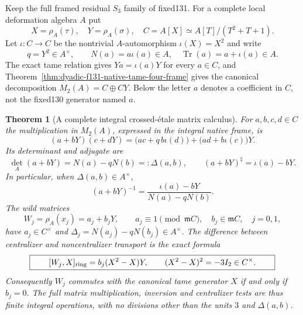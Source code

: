 \documentclass[11pt]{article}
\newtheorem{theorem}{Theorem}[section]
\theoremstyle{definition}
\begin{document}
Keep the full framed residual $S_3$ family of fixed131.
For a complete local deformation algebra $A$ put
\[
X=\rho_A(\tau),\quad Y=\rho_A(\sigma),\quad
C=A[X]\simeq A[T]/(T^2+T+1).
\]
Let $\iota:C\to C$ be the nontrivial
$A$-automorphism $\iota(X)=X^2$ and write
\begin{equation}\label{eq:dyadic-f132-crossed-setup}
q=Y^2\in A^\times,\qquad
N(a)=a\iota(a)\in A,\quad
\operatorname{Tr}(a)=a+\iota(a)\in A.
\end{equation}
The exact tame relation gives
$Y a=\iota(a)Y$ for every $a\in C$,
and Theorem~\ref{thm:dyadic-f131-native-tame-four-frame}
gives the canonical decomposition
$M_2(A)=C\oplus CY$.
Below the letter $a$ denotes a
coefficient in $C$, not the
fixed130 generator named $a$.

\begin{theorem}[A complete integral crossed-\'etale matrix calculus]
\label{thm:dyadic-f132-crossed-etale-multiplication}
For $a,b,c,d\in C$ the multiplication
in $M_2(A)$, expressed in the integral
native frame, is
\begin{equation}\label{eq:dyadic-f132-crossed-product-law}
\boxed{
(a+bY)(c+dY)
=
\bigl(ac+q\,b\iota(d)\bigr)
+\bigl(ad+b\iota(c)\bigr)Y.
}
\end{equation}
Its determinant and adjugate are
\begin{equation}\label{eq:dyadic-f132-crossed-determinant}
\boxed{
\det_A(a+bY)=N(a)-qN(b)=:\Delta(a,b),
\qquad
(a+bY)^\natural=\iota(a)-bY.
}
\end{equation}
In particular, when $\Delta(a,b)\in A^\times$,
\begin{equation}\label{eq:dyadic-f132-crossed-inverse}
\boxed{\qquad
(a+bY)^{-1}
=\frac{\iota(a)-bY}{N(a)-qN(b)}.
\qquad}
\end{equation}
The wild matrices
\[
W_j=\rho_A(x_j)=a_j+b_jY,\qquad
a_j\equiv1\pmod{\mathfrak m C},\quad
b_j\in\mathfrak m C,
\quad j=0,1,
\]
have $a_j\in C^\times$ and
$\Delta_j=N(a_j)-qN(b_j)\in A^\times$.
The difference between centralizer
and noncentralizer transport is
the exact formula
\begin{equation}\label{eq:dyadic-f132-wild-commutator}
\boxed{\qquad
[W_j,X]_{\rm ring}
=b_j(X^2-X)Y,\qquad
(X^2-X)^2=-3I_2\in C^\times.
\qquad}
\end{equation}
Consequently $W_j$ commutes with
the canonical tame generator $X$
if and only if $b_j=0$.
The full matrix multiplication,
inversion and centralizer tests
are thus finite integral operations,
with no divisions other than the
units $3$ and $\Delta(a,b)$.
\end{theorem}
\end{document}
